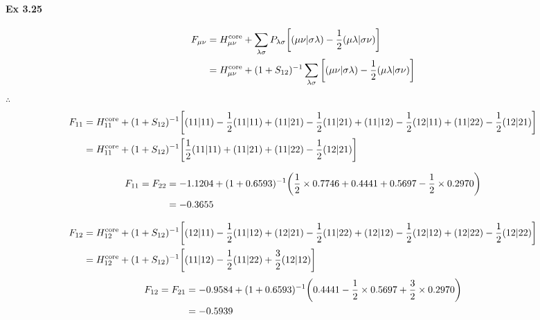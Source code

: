 \documentclass[a4paper]{article}
\DeclareMathOperator{\core}{\mathrm{core}}
\newcommand{\ex}[1]{\paragraph{Ex #1}}
\numberwithin{equation}{subsection}
\begin{document}
\ex{3.25}
\begin{align}
F_{\mu\nu} &= H^{\core}_{\mu\nu} + \sum_{\lambda\sigma} P_{\lambda\sigma} \qty[(\mu\nu|\sigma\lambda) - \dfrac{1}{2}(\mu\lambda|\sigma\nu)] \notag\\
&= H^{\core}_{\mu\nu} + (1+S_{12})^{-1} \sum_{\lambda\sigma} \qty[(\mu\nu|\sigma\lambda) - \dfrac{1}{2}(\mu\lambda|\sigma\nu)] %
\end{align}
$ \therefore $
\begin{align}
F_{11} &= H^{\core}_{11} + (1+S_{12})^{-1} 
\qty[(11|11) - \dfrac{1}{2}(1 1|1 1) 
+ (11|21) - \dfrac{1}{2}(1 1|2 1)
+ (11|12) - \dfrac{1}{2}(1 2|1 1)
+ (11|22) - \dfrac{1}{2}(1 2|2 1)] \notag\\
&= H^{\core}_{11} + (1+S_{12})^{-1} 
\qty[\dfrac{1}{2}(1 1|1 1) + (1 1|2 1) + (11|22) - \dfrac{1}{2}(1 2|2 1)] 
\end{align}
\iffalse
\begin{align}
F_{22} &= H^{\core}_{22} + (1+S_{12})^{-1} 
\qty[(22|11) - \dfrac{1}{2}(2 1|1 2) 
+ (22|21) - \dfrac{1}{2}(2 1|2 2)
+ (22|12) - \dfrac{1}{2}(2 2|1 2)
+ (22|22) - \dfrac{1}{2}(2 2|2 2)] \notag\\
&= H^{\core}_{22} + (1+S_{12})^{-1} 
\qty[(22|11) - \dfrac{1}{2}(2 1|1 2) 
+ (22|21) 
+ \dfrac{1}{2}(2 2|2 2)] \notag\\
&= H^{\core}_{11} + (1+S_{12})^{-1} 
\qty[(11|22) - \dfrac{1}{2}(1 2|2 1) 
+ (11|12) 
+ \dfrac{1}{2}(11|11)] 
\end{align}
\fi
\begin{align}
F_{11} = F_{22} &= -1.1204 + (1 + 0.6593)^{-1} \qty(\dfrac{1}{2}\times 0.7746 + 0.4441 + 0.5697 -\dfrac{1}{2}\times 0.2970) \notag\\
&= -0.3655
\end{align}

\begin{align}
F_{12} &= H^{\core}_{12} + (1+S_{12})^{-1} 
\qty[(12|11) - \dfrac{1}{2}(1 1|1 2) 
+ (12|21) - \dfrac{1}{2}(1 1|22)
+ (12|12) - \dfrac{1}{2}(1 2|1 2)
+ (12|22) - \dfrac{1}{2}(1 2|2 2)] \notag\\
&= H^{\core}_{12} + (1+S_{12})^{-1} 
\qty[ (1 1|1 2) 
 - \dfrac{1}{2}(1 1|22)
+  \dfrac{3}{2}(1 2|1 2)] 
\end{align}
\begin{align}
F_{12} = F_{21} &= -0.9584 + (1 + 0.6593)^{-1} \qty(0.4441 - \dfrac{1}{2}\times 0.5697 + \dfrac{3}{2}\times 0.2970) \notag\\
&= -0.5939
\end{align}
\end{document}
